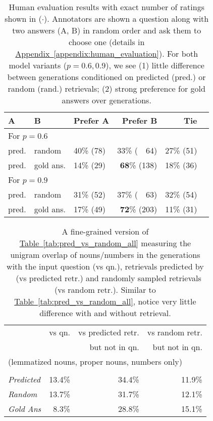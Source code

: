 \documentclass[11pt]{article}
\newcommand{\namedref}[2]{\hyperref[#2]{#1~\ref*{#2}}}
\newcommand{\tableref}[1]{\namedref{Table}{#1}}
\newcommand{\appendixref}[1]{\namedref{Appendix}{#1}}
\newcommand{\retriever}[1]{\textsc{c-REALM}}
\begin{document}
\begin{table}[t]
\small
\begin{center}
\begin{tabular}{ lllrrr } 
 \toprule
A & B &  Prefer A & Prefer B & Tie \\
\midrule
\multicolumn{5}{l}{For $p=0.6$}\\
 pred. & random & 40\% (78) & 33\% (~~64) & 27\% (51) \\
 pred. & gold ans. & 14\% (29) & \textbf{68}\% (138) & 18\% (36) \\
 \midrule
\multicolumn{5}{l}{For $p=0.9$}\\
  pred. & random & 31\% (52) & 37\% (~~63) & 32\% (54)\\
 pred. & gold ans. & 17\% (49) & \textbf{72}\% (203) & 11\% (31) \\
\bottomrule
\end{tabular}
\end{center}
\caption{Human evaluation results with exact number of ratings shown in ($\cdot$). Annotators are shown a question along with two answers (A, B) in random order and ask them to choose one (details in \appendixref{appendix:human_evaluation}). For both model variants ($p=0.6, 0.9$), we see (1) little difference between generations conditioned on predicted (pred.) or random (rand.) retrievals; (2) strong preference for gold answers over generations. }

\label{tab:human_evaluation}
\end{table}

\begin{table}[t]
\small
\begin{center}
\begin{tabular}{ lrrr } 
 \toprule
  & vs qn. & vs predicted retr. & vs random retr. \\
 & & but not in qn. & but not in qn. \\
\midrule
\multicolumn{4}{l}{(lemmatized nouns, proper nouns, numbers only)} \\\\
\emph{Predicted} & 13.4\% & 34.4\% & 11.9\% \\
\emph{Random} & 13.7\% & 31.7\% & 12.1\% \\
\midrule
\emph{Gold Ans} & 8.3\% & 28.8\% & 15.1\% \\
\bottomrule
\end{tabular}
\end{center}
\caption{A fine-grained version of \tableref{tab:pred_vs_random_all} measuring the unigram overlap of nouns/numbers in the generations with the input question (vs qn.), retrievals predicted by \retriever~ (vs predicted retr.) and randomly sampled retrievals (vs random retr.). Similar to \tableref{tab:pred_vs_random_all}, notice very little difference with and without retrieval.}
\label{tab:pred_vs_random_all_nouns}
\end{table}
\end{document}

